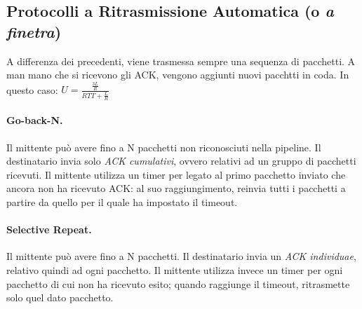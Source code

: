 \subsection{Protocolli a Ritrasmissione Automatica (o \textit{a finetra})}
A differenza dei precedenti, viene trasmessa sempre una sequenza di pacchetti. A man mano che si ricevono gli ACK, vengono aggiunti nuovi pacchtti in coda.
In questo caso: $ U = \frac{\frac{3L}{R}}{RTT + \frac{L}{R}} $ \\
\paragraph{Go-back-N.} Il mittente può avere fino a N pacchetti non riconosciuti nella pipeline. Il destinatario invia solo \textit{ACK cumulativi}, ovvero relativi ad un gruppo di pacchetti ricevuti. Il mittente utilizza un timer per legato al primo pacchetto inviato che ancora non ha ricevuto ACK: al suo raggiungimento, reinvia tutti i pacchetti a partire da quello per il quale ha impostato il timeout.
\paragraph{Selective Repeat.} Il mittente può avere fino a N pacchetti. Il destinatario invia un \textit{ACK individuae}, relativo quindi ad ogni pacchetto. Il mittente utilizza invece un timer per ogni pacchetto di cui non ha ricevuto esito; quando raggiunge il timeout, ritrasmette solo quel dato pacchetto.

